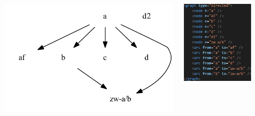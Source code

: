 \documentclass[10pt]{beamer}
\begin{document}
	\begin{frame}
		\begin{columns}
			\begin{column}{0.55\textwidth}
				\includegraphics[width=\textwidth]{../img/B25K1V4U22-26-local-stemma-no-legend.pdf}
			\end{column}
			\begin{column}{0.4\textwidth}
				\includegraphics[scale=0.6667]{../img/local-stemma-xml.png}
			\end{column}
		\end{columns}
	\end{frame}
\end{document}
